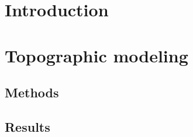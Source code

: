 \documentclass[Afour,sageh,times]{sagej}
\begin{document}
%

















\clearpage




\section{Introduction}


\section{Topographic modeling}
\subsection{Methods}
\subsection{Results}
\end{document}
